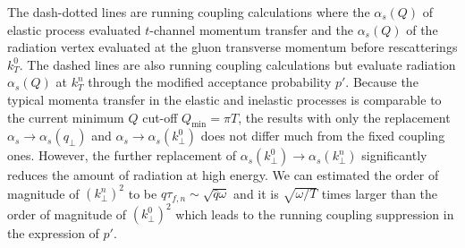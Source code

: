 \documentclass[aps, prc, reprint, amsmath, groupedaddress, nofootinbib]{revtex4-1}
\begin{document}
The dash-dotted lines are running coupling calculations where the $\alpha_s(Q)$ of elastic process evaluated $t$-channel momentum transfer and the $\alpha_s(Q)$ of the radiation vertex evaluated at the gluon transverse momentum before rescatterings $k_T^0$.
The dashed lines are also running coupling calculations but evaluate radiation $\alpha_s(Q)$ at $k_T^n$ through the modified acceptance probability $p'$.
Because the typical momenta transfer in the elastic and inelastic processes is comparable to the current minimum $Q$ cut-off $Q_{\min} = \pi T$, the results with only the replacement $\alpha_s\rightarrow\alpha_s(q_\perp)$ and $\alpha_s\rightarrow\alpha_s(k_\perp^0)$ does not differ much from the fixed coupling ones.
However, the further replacement of $\alpha_s(k_\perp^0)\rightarrow\alpha_s(k_\perp^n)$ significantly reduces the amount of radiation at high energy.
We can estimated the order of magnitude of $\left(k_\perp^n\right)^2$ to be $\hat{q}\tau_{f,n} \sim \sqrt{\hat{q}\omega}$ and it is $\sqrt{\omega/T}$ times larger than the order of magnitude of $\left(k_\perp^0\right)^2$ which leads to the running coupling suppression in the expression of $p'$.
\end{document}
